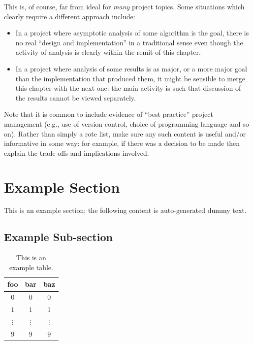 \documentclass[ %
                    author={Tom Jager},
                supervisor={Dr. Daniel Schien},
                    degree={MEng},
                     title={A Bayesian Inference Engine for UMIS Structured Data},
                  subtitle={},
                      type={research},
                      year={2019} ]{dissertation}
\begin{document}
This is, of course, far from ideal for {\em many} project topics.  Some
situations which clearly require a different approach include:

\begin{itemize}
\item In a project where asymptotic analysis of some algorithm is the goal,
      there is no real ``design and implementation'' in a traditional sense
      even though the activity of analysis is clearly within the remit of
      this chapter.
\item In a project where analysis of some results is as major, or a more
      major goal than the implementation that produced them, it might be
      sensible to merge this chapter with the next one: the main activity 
      is such that discussion of the results cannot be viewed separately.
\end{itemize}

\noindent
Note that it is common to include evidence of ``best practice'' project 
management (e.g., use of version control, choice of programming language 
and so on).  Rather than simply a rote list, make sure any such content 
is useful and/or informative in some way: for example, if there was a 
decision to be made then explain the trade-offs and implications 
involved.

\section{Example Section}

This is an example section; 
the following content is auto-generated dummy text.
\lipsum

\subsection{Example Sub-section}



\begin{table}[t]
\centering
\begin{tabular}{|cc|c|}
\hline
foo      & bar      & baz      \\
\hline
$0     $ & $0     $ & $0     $ \\
$1     $ & $1     $ & $1     $ \\
$\vdots$ & $\vdots$ & $\vdots$ \\
$9     $ & $9     $ & $9     $ \\
\hline
\end{tabular}
\caption{This is an example table.}
\label{tab}
\end{table}
\end{document}
